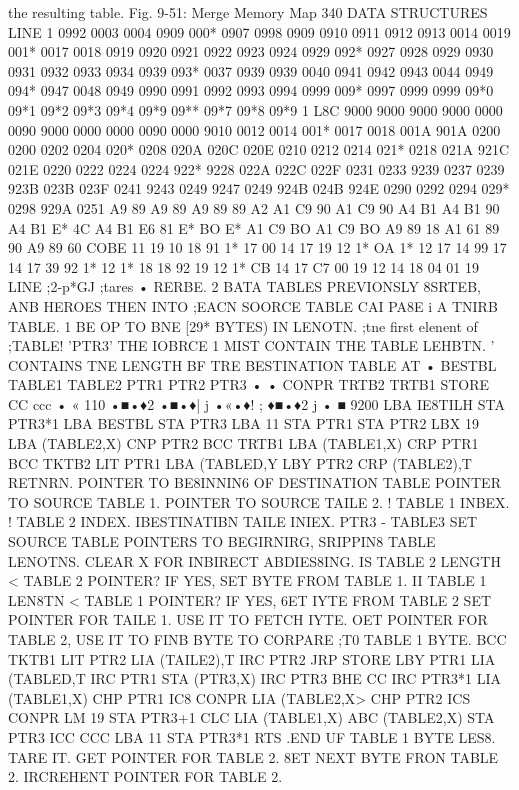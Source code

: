 \documentclass{book}
\begin{document}
{{{{{{{{{{{{{{{{{{{{{{{{{{{{{{{{{{{{{{{{{{{{{{{{{{{{{{{{{{{{{{{{{{{{{{{{{{{{{{{{{{{{{{{{{{{{{{{the resulting table.
Fig. 9-51: Merge Memory Map
340
DATA STRUCTURES
LINE 1
0992
0003
0004
0909
000*
0907
0998
0909
0910
0911
0912
0913
0014
0019
001*
0017
0018
0919
0920
0921
0922
0923
0924
0929
092*
0927
0928
0929
0930
0931
0932
0933
0934
0939
093*
0037
0939
0939
0040
0941
0942
0943
0044
0949
094*
0947
0048
0949
0990
0991
0992
0993
0994
0999
009*
0997
0999
0999
09*0
09*1
09*2
09*3
09*4
09*9
09**
09*7
09*8
09*9
1 L8C
9000
9000
9000
9000
0000
0090
9000
0000
0000
0090
0000
9010
0012
0014
001*
0017
0018
001A
901A
0200
0200
0202
0204
020*
0208
020A
020C
020E
0210
0212
0214
021*
0218
021A
921C
021E
0220
0222
0224
0224
922*
9228
022A
022C
022F
0231
0233
9239
0237
0239
923B
023B
023F
0241
9243
0249
9247
0249
924B
024B
924E
0290
0292
0294
029*
0298
929A
0251
A9
89
A9
89
A9
89
89
A2
A1
C9
90
A1
C9
90
A4
B1
A4
B1
90
A4
B1
E*
4C
A4
B1
E6
81
E*
BO
E*
A1
C9
BO
A1
C9
BO
A9
89
18
A1
61
89
90
A9
89
60
COBE
11
19
10
18
91
1*
17
00
14
17
19
12
1*
OA
1*
12
17
14
99
17
14
17
39 92
1*
12
1*
18
18
92
19
12
1*
CB
14
17
C7
00
19
12
14
18
04
01
19
LINE
;2-p*GJ
;tares
• RERBE.
2 BATA TABLES PREVIONSLY 8SRTEB,
{ANB HEROES THEN INTO
;EACN SOORCE TABLE CAI
{PA8E i
A TNIRB TABLE.
1 BE OP TO BNE
[29* BYTES) IN LENOTN.
;tne first elenent of
;TABLE!
{'PTR3'
THE IOBRCE
1 MIST CONTAIN THE TABLE LEHBTN.
' CONTAINS TNE LENGTH BF TRE
{BESTINATION TABLE AT
•
BESTBL
TABLE1
TABLE2
PTR1
PTR2
PTR3
•
•
CONPR
TRTB2
TRTB1
STORE
CC
ccc
• « 110
•■•♦2
•■•♦| j
•«•♦! ;
♦■•♦2 j
• ■ 9200
LBA IE8TILH
STA PTR3*1
LBA BESTBL
STA PTR3
LBA 11
STA PTR1
STA PTR2
LBX 19
LBA (TABLE2,X)
CNP PTR2
BCC TRTB1
LBA (TABLE1,X)
CRP PTR1
BCC TKTB2
LIT PTR1
LBA (TABLED,Y
LBY PTR2
CRP (TABLE2),T
RETNRN.
{POINTER TO BE8INNIN6 OF DESTINATION TABLE
{POINTER TO SOURCE TABLE 1.
{POINTER TO SOURCE TAILE 2.
! TABLE 1 INBEX.
! TABLE 2 INDEX.
IBESTINATIBN TAILE INIEX.
{PTR3 - TABLE3
{SET SOURCE TABLE POINTERS TO BEGIRNIRG,
{SRIPPIN8 TABLE LENOTNS.
{CLEAR X FOR INBIRECT ABDIES8ING.
{IS TABLE 2 LENGTH <
{TABLE 2 POINTER?
{IF YES, SET BYTE FROM TABLE 1.
{II TABLE 1 LEN8TN <
{TABLE 1 POINTER?
{IF YES, 6ET IYTE FROM TABLE 2
{SET POINTER FOR TAILE 1.
{USE IT TO FETCH IYTE.
{OET POINTER FOR TABLE 2,
{USE IT TO FINB BYTE TO CORPARE
;T0 TABLE 1 BYTE.
BCC TKTB1
LIT PTR2
LIA (TAILE2),T
IRC PTR2
JRP STORE
LBY PTR1
LIA (TABLED,T
IRC PTR1
STA (PTR3,X)
IRC PTR3
BHE CC
IRC PTR3*1
LIA (TABLE1,X)
CHP PTR1
IC8 CONPR
LIA (TABLE2,X>
CHP PTR2
ICS CONPR
LM 19
STA PTR3+1
CLC
LIA (TABLE1,X)
ABC (TABLE2,X)
STA PTR3
ICC CCC
LBA 11
STA PTR3*1
RTS
.END
UF TABLE 1 BYTE LES8. TARE IT.
{GET POINTER FOR TABLE 2.
{8ET NEXT BYTE FRON TABLE 2.
{IRCREHENT POINTER FOR TABLE 2.
}}}}}}}}}}}}}}}}}}}}}}}}}}}}}}}}}}}}}}}}}}}}}}}}}}}}}}}}}}}}}}}}}}}}}}}}}}}}}}}}}}}}}}}}}}}}}}}}}}}}}}}}}}}}}}}}}}}}}}}
\end{document}
